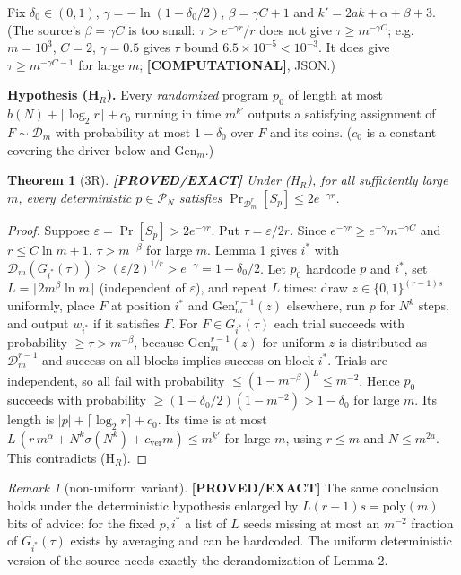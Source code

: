 \documentclass[11pt]{article}
\newtheorem{theorem}{Theorem}
\theoremstyle{remark}
\newtheorem*{remark}{Remark}
\newcommand{\D}{\mathcal{D}}
\newcommand{\PN}{\mathcal{P}_N}
\newcommand{\status}[1]{\textbf{[#1]}}
\begin{document}
Fix $\delta_0\in(0,1)$, $\gamma=-\ln(1-\delta_0/2)$, $\beta=\gamma C+1$ and $k'=2ak+\alpha+\beta+3$.
(The source's $\beta=\gamma C$ is too small: $\tau>e^{-\gamma r}/r$ does not give $\tau\ge m^{-\gamma C}$;
e.g.\ $m=10^3$, $C=2$, $\gamma=0.5$ gives $\tau$ bound $6.5\times10^{-5}<10^{-3}$. It does give
$\tau\ge m^{-\gamma C-1}$ for large $m$; \status{COMPUTATIONAL}, JSON.)

\noindent\textbf{Hypothesis (H$_R$).} Every \emph{randomized} program $p_0$ of length at most
$b(N)+\lceil\log_2 r\rceil+c_0$ running in time $m^{k'}$ outputs a satisfying assignment of $F\sim\D_m$
with probability at most $1-\delta_0$ over $F$ and its coins. ($c_0$ is a constant covering the driver
below and $\mathrm{Gen}_m$.)

\begin{theorem}[3R] \status{PROVED/EXACT}
Under (H$_R$), for all sufficiently large $m$, every deterministic $p\in\PN$ satisfies
$\Pr_{\D_m^r}[S_p]\le 2e^{-\gamma r}$.
\end{theorem}
\begin{proof}
Suppose $\varepsilon=\Pr[S_p]>2e^{-\gamma r}$. Put $\tau=\varepsilon/2r$. Since
$e^{-\gamma r}\ge e^{-\gamma}m^{-\gamma C}$ and $r\le C\ln m+1$, $\tau>m^{-\beta}$ for large $m$.
Lemma 1 gives $i^*$ with $\D_m(G_{i^*}(\tau))\ge(\varepsilon/2)^{1/r}>e^{-\gamma}=1-\delta_0/2$.
Let $p_0$ hardcode $p$ and $i^*$, set $L=\lceil 2m^{\beta}\ln m\rceil$ (independent of $\varepsilon$), and
repeat $L$ times: draw $z\in\{0,1\}^{(r-1)s}$ uniformly, place $F$ at position $i^*$ and
$\mathrm{Gen}_m^{r-1}(z)$ elsewhere, run $p$ for $N^k$ steps, and output $w_{i^*}$ if it satisfies $F$.
For $F\in G_{i^*}(\tau)$ each trial succeeds with probability $\ge\tau>m^{-\beta}$, because
$\mathrm{Gen}_m^{r-1}(z)$ for uniform $z$ is distributed as $\D_m^{r-1}$ and success on all blocks implies
success on block $i^*$. Trials are independent, so all fail with probability
$\le(1-m^{-\beta})^L\le m^{-2}$. Hence $p_0$ succeeds with probability
$\ge(1-\delta_0/2)(1-m^{-2})>1-\delta_0$ for large $m$. Its length is
$|p|+\lceil\log_2 r\rceil+c_0$. Its time is at most
$L\,(r\,m^{\alpha}+N^k\sigma(N^k)+c_{\mathrm{ver}}m)\le m^{k'}$ for large $m$, using $r\le m$ and
$N\le m^{2a}$. This contradicts (H$_R$).
\end{proof}

\begin{remark}[non-uniform variant] \status{PROVED/EXACT}
The same conclusion holds under the deterministic hypothesis enlarged by $L(r-1)s=\mathrm{poly}(m)$ bits
of advice: for the fixed $p,i^*$ a list of $L$ seeds missing at most an $m^{-2}$ fraction of
$G_{i^*}(\tau)$ exists by averaging and can be hardcoded. The uniform deterministic version of the
source needs exactly the derandomization of Lemma 2.
\end{remark}
\end{document}
